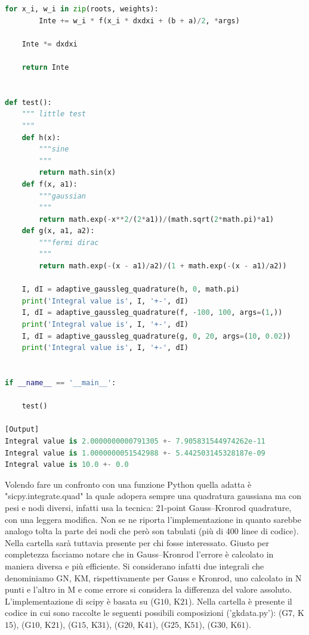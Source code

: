 \documentclass[10pt,a4paper]{article}
\begin{document}
\begin{lstlisting}[language=Python]
    for x_i, w_i in zip(roots, weights):
        Inte += w_i * f(x_i * dxdxi + (b + a)/2, *args)

    Inte *= dxdxi

    return Inte


def test():
    """ little test
    """
    def h(x):
        """sine
        """
        return math.sin(x)
    def f(x, a1):
        """gaussian
        """
        return math.exp(-x**2/(2*a1))/(math.sqrt(2*math.pi)*a1)
    def g(x, a1, a2):
        """fermi dirac
        """
        return math.exp(-(x - a1)/a2)/(1 + math.exp(-(x - a1)/a2))

    I, dI = adaptive_gaussleg_quadrature(h, 0, math.pi)
    print('Integral value is', I, '+-', dI)
    I, dI = adaptive_gaussleg_quadrature(f, -100, 100, args=(1,))
    print('Integral value is', I, '+-', dI)
    I, dI = adaptive_gaussleg_quadrature(g, 0, 20, args=(10, 0.02))
    print('Integral value is', I, '+-', dI)


if __name__ == '__main__':

    test()

[Output]
Integral value is 2.0000000000791305 +- 7.905831544974262e-11
Integral value is 1.0000000051542988 +- 5.442503145328187e-09
Integral value is 10.0 +- 0.0
\end{lstlisting}

Volendo fare un confronto con una funzione Python quella adatta è "sicpy.integrate.quad" la quale adopera sempre una quadratura gaussiana ma con pesi e nodi diversi, infatti usa la tecnica: 21-point Gauss–Kronrod quadrature, con una leggera modifica. Non se ne riporta l'implementazione in quanto sarebbe analogo tolta la parte dei nodi che però son tabulati (più di 400 linee di codice). Nella cartella sarà tuttavia presente per chi fosse interessato. Giusto per completezza facciamo notare che in Gauss–Kronrod l'errore è calcolato in maniera diversa e più efficiente. Si considerano infatti due integrali che denominiamo GN, KM, rispettivamente per Gauss e Kronrod, uno calcolato in N punti e l'altro in M e come errore si considera la differenza del valore assoluto. L'implementazione di scipy è basata su (G$10$, K$21$). Nella cartella è presente il codice in cui sono raccolte le seguenti possibili composizioni ('gkdata.py'): (G$7$,  K$15$), (G$10$, K$21$), (G$15$, K$31$), (G$20$, K$41$), (G$25$, K$51$), (G$30$, K$61$).

\newpage
\end{document}
